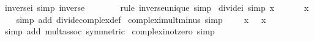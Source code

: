 \begin{isabellebody}
{\isafoldproof}%
%
\isadelimproof
\isanewline
%
\endisadelimproof
\isanewline
{}\isamarkupfalse%
\ inverse{\isacharunderscore}{\kern0pt}i\ {\isacharbrackleft}{\kern0pt}simp{\isacharbrackright}{\kern0pt}{\isacharcolon}{\kern0pt}\ {\isachardoublequoteopen}inverse\ {\isasymi}\ {\isacharequal}{\kern0pt}\ {\isacharminus}{\kern0pt}\ {\isasymi}{\isachardoublequoteclose}\isanewline
%
\isadelimproof
\ \ %
\endisadelimproof
%
\isatagproof
{}\isamarkupfalse%
\ {\isacharparenleft}{\kern0pt}rule\ inverse{\isacharunderscore}{\kern0pt}unique{\isacharparenright}{\kern0pt}\ simp%
\endisatagproof
{\isafoldproof}%
%
\isadelimproof
\isanewline
%
\endisadelimproof
\isanewline
{}\isamarkupfalse%
\ divide{\isacharunderscore}{\kern0pt}i\ {\isacharbrackleft}{\kern0pt}simp{\isacharbrackright}{\kern0pt}{\isacharcolon}{\kern0pt}\ {\isachardoublequoteopen}x\ {\isacharslash}{\kern0pt}\ {\isasymi}\ {\isacharequal}{\kern0pt}\ {\isacharminus}{\kern0pt}\ {\isasymi}\ {\isacharasterisk}{\kern0pt}\ x{\isachardoublequoteclose}\isanewline
%
\isadelimproof
\ \ %
\endisadelimproof
%
\isatagproof
{}\isamarkupfalse%
\ {\isacharparenleft}{\kern0pt}simp\ add{\isacharcolon}{\kern0pt}\ divide{\isacharunderscore}{\kern0pt}complex{\isacharunderscore}{\kern0pt}def{\isacharparenright}{\kern0pt}%
\endisatagproof
{\isafoldproof}%
%
\isadelimproof
\isanewline
%
\endisadelimproof
\isanewline
{}\isamarkupfalse%
\ complex{\isacharunderscore}{\kern0pt}i{\isacharunderscore}{\kern0pt}mult{\isacharunderscore}{\kern0pt}minus\ {\isacharbrackleft}{\kern0pt}simp{\isacharbrackright}{\kern0pt}{\isacharcolon}{\kern0pt}\ {\isachardoublequoteopen}{\isasymi}\ {\isacharasterisk}{\kern0pt}\ {\isacharparenleft}{\kern0pt}{\isasymi}\ {\isacharasterisk}{\kern0pt}\ x{\isacharparenright}{\kern0pt}\ {\isacharequal}{\kern0pt}\ {\isacharminus}{\kern0pt}\ x{\isachardoublequoteclose}\isanewline
%
\isadelimproof
\ \ %
\endisadelimproof
%
\isatagproof
{}\isamarkupfalse%
\ {\isacharparenleft}{\kern0pt}simp\ add{\isacharcolon}{\kern0pt}\ mult{\isachardot}{\kern0pt}assoc\ {\isacharbrackleft}{\kern0pt}symmetric{\isacharbrackright}{\kern0pt}{\isacharparenright}{\kern0pt}%
\endisatagproof
{\isafoldproof}%
%
\isadelimproof
\isanewline
%
\endisadelimproof
\isanewline
{}\isamarkupfalse%
\ complex{\isacharunderscore}{\kern0pt}i{\isacharunderscore}{\kern0pt}not{\isacharunderscore}{\kern0pt}zero\ {\isacharbrackleft}{\kern0pt}simp{\isacharbrackright}{\kern0pt}{\isacharcolon}{\kern0pt}\ {\isachardoublequoteopen}{\isasymi}\ {\isasymnoteq}\ {}{\isachardoublequoteclose}\isanewline

\end{isabellebody}
